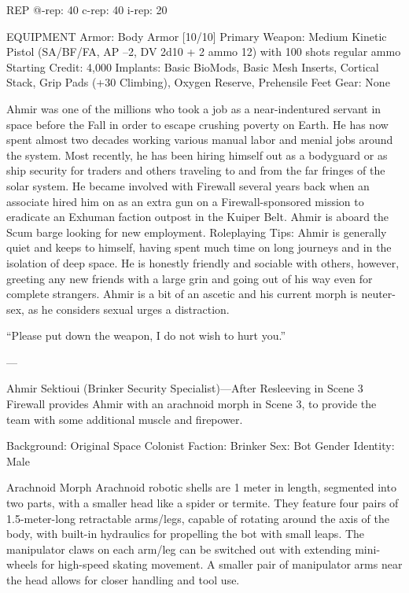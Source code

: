 REP
@-rep:	40
c-rep:	40
i-rep:	20

EQUIPMENT
Armor: Body Armor [10/10]
Primary Weapon: Medium Kinetic Pistol (SA/BF/FA, AP –2, DV 2d10 + 2 ammo 12) with 100 shots regular ammo
Starting Credit: 4,000
Implants: Basic BioMods, Basic Mesh Inserts, Cortical Stack, Grip Pads (+30 Climbing), Oxygen Reserve, Prehensile Feet
Gear: None

Ahmir was one of the millions who took a job as a near-indentured servant in space before the Fall in order to escape crushing poverty on Earth. He has now spent almost two decades working various manual labor and menial jobs around the system. Most recently, he has been hiring himself out as a bodyguard or as ship security for traders and others traveling to and from the far fringes of the solar system. He became involved with Firewall several years back when an associate hired him on as an extra gun on a Firewall-sponsored mission to eradicate an Exhuman faction outpost in the Kuiper Belt. Ahmir is aboard the Scum barge looking for new employment.
Roleplaying Tips: Ahmir is generally quiet and keeps to himself, having spent much time on long journeys and in the isolation of deep space. He is honestly friendly and sociable with others, however, greeting any new friends with a large grin and going out of his way even for complete strangers. Ahmir is a bit of an ascetic and his current morph is neuter-sex, as he considers sexual urges a distraction.

“Please put down the weapon, I do not wish to hurt you.”

---

Ahmir Sektioui (Brinker Security Specialist)—After Resleeving in Scene 3
Firewall provides Ahmir with an arachnoid morph in Scene 3, to provide the team with some additional muscle and firepower.

Background: Original Space Colonist
Faction: Brinker
Sex: Bot
Gender Identity: Male

Arachnoid Morph
Arachnoid robotic shells are 1 meter in length, segmented into two parts, with a smaller head like a spider or termite. They feature four pairs of 1.5-meter-long retractable arms/legs, capable of rotating around the axis of the body, with built-in hydraulics for propelling the bot with small leaps. The manipulator claws on each arm/leg can be switched out with extending mini-wheels for high-speed skating movement. A smaller pair of manipulator arms near the head allows for closer handling and tool use.

